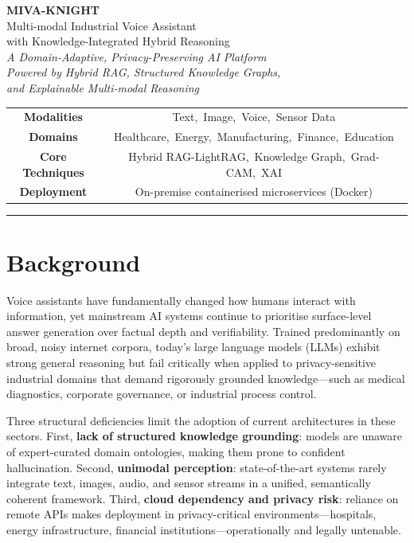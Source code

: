 \documentclass[12pt,a4paper]{article}
\begin{document}
\begin{center}
  {\LARGE\bfseries\color{mivablue} MIVA-KNIGHT}\\[0.3cm]
  {\large\color{mivablue!80}
    Multi-modal Industrial Voice Assistant\\[0.15cm]
    with Knowledge-Integrated Hybrid Reasoning}\\[0.5cm]
  {\normalsize\color{mivagray}
    \textit{A Domain-Adaptive, Privacy-Preserving AI Platform\\
    Powered by Hybrid RAG, Structured Knowledge Graphs,\\
    and Explainable Multi-modal Reasoning}}\\[0.6cm]
  \begin{tabular}{cc}
    \toprule
    \textbf{Modalities}      & Text,\ Image,\ Voice,\ Sensor Data \\
    \textbf{Domains}         & Healthcare,\ Energy,\ Manufacturing,\ Finance,\ Education \\
    \textbf{Core Techniques} & Hybrid RAG-LightRAG,\ Knowledge Graph,\ Grad-CAM,\ XAI \\
    \textbf{Deployment}      & On-premise containerised microservices (Docker) \\
    \bottomrule
  \end{tabular}
\end{center}

\vspace{0.5cm}
\hrule
\vspace{0.5cm}

\section*{Background}

Voice assistants have fundamentally changed how humans interact with information, yet
mainstream AI systems continue to prioritise surface-level answer generation over
factual depth and verifiability. Trained predominantly on broad, noisy internet corpora,
today's large language models (LLMs) exhibit strong general reasoning but fail critically
when applied to privacy-sensitive industrial domains that demand rigorously grounded
knowledge---such as medical diagnostics, corporate governance, or industrial process control.

Three structural deficiencies limit the adoption of current architectures in these sectors.
First, \textbf{lack of structured knowledge grounding}: models are unaware of
expert-curated domain ontologies, making them prone to confident hallucination.
Second, \textbf{unimodal perception}: state-of-the-art systems rarely integrate text,
images, audio, and sensor streams in a unified, semantically coherent framework.
Third, \textbf{cloud dependency and privacy risk}: reliance on remote APIs makes
deployment in privacy-critical environments---hospitals, energy infrastructure,
financial institutions---operationally and legally untenable.
\end{document}

